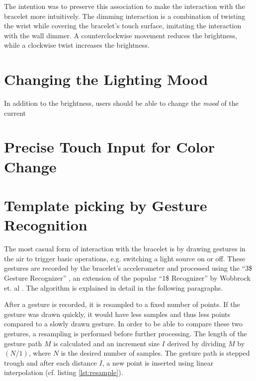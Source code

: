 The intention was to preserve this association to make the interaction with the bracelet more intuitively. The dimming interaction is a combination of twisting the wrist while covering the bracelet's touch surface, imitating the interaction with the wall dimmer. A counterclockwise movement reduces the brightness, while a clockwise twist increases the brightness.

\section{Changing the Lighting Mood}
In addition to the brightness, users should be able to change the \textit{mood} of the current 

\section{Precise Touch Input for Color Change}

\section{Template picking by Gesture Recognition}
The most casual form of interaction with the bracelet is by drawing gestures in the air to trigger basic operations, e.g. switching a light source on or off. These gestures are recorded by the bracelet's accelerometer and processed using the ``3\$ Gesture Recognizer'' \cite{Kratz2010}, an extension of the popular ``1\$ Recognizer'' by Wobbrock et. al \cite{Wobbrock2007}. The algorithm is explained in detail in the following paragraphs.

After a gesture is recorded, it is resampled to a fixed number of points. If the gesture was drawn quickly, it would have less samples and thus less points compared to a slowly drawn gesture. In order to be able to compare these two gestures, a resampling is performed before further processing. The length of the gesture path $M$ is calculated and an increment size $I$ derived by dividing $M$ by $(N/1)$, where $N$ is the desired number of samples. The gesture path is stepped trough and after each distance $I$, a new point is inserted using linear interpolation (cf. listing \ref{lst:resample}). %

